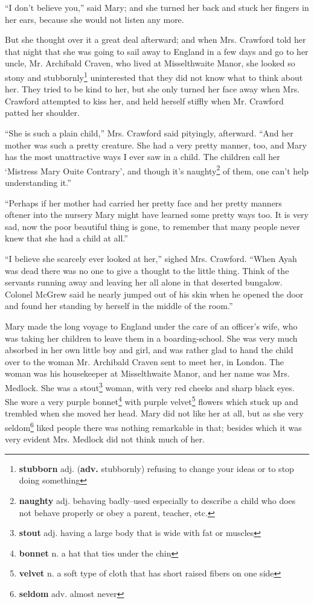 ``I don't believe you,'' said Mary; and she turned her back and stuck her fingers in her ears, because she would not listen any more.

But she thought over it a great deal afterward; and when Mrs. Crawford told her that night that she was going to sail away to England in a few days and go to her uncle, Mr. Archibald Craven, who lived at Misselthwaite Manor, she looked so stony and stubbornly\footnote{\textbf{stubborn} adj. (\textbf{adv.} stubbornly) refusing to change your ideas or to stop doing something} uninterested that they did not know what to think about her. They tried to be kind to her, but she only turned her face away when Mrs. Crawford attempted to kiss her, and held herself stiffly when Mr. Crawford patted her shoulder.

``She is such a plain child,'' Mrs. Crawford said pityingly, afterward. ``And her mother was such a pretty creature. She had a very pretty manner, too, and Mary has the most unattractive ways I ever saw in a child. The children call her `Mistress Mary Ouite Contrary', and though it's naughty\footnote{\textbf{naughty} adj. behaving badly--used especially to describe a child who does not behave properly or obey a parent, teacher, etc.} of them, one can't help understanding it.''

``Perhaps if her mother had carried her pretty face and her pretty manners oftener into the nursery Mary might have learned some pretty ways too. It is very sad, now the poor beautiful thing is gone, to remember that many people never knew that she had a child at all.''

``I believe she scarcely ever looked at her,'' sighed Mrs. Crawford. ``When Ayah was dead there was no one to give a thought to the little thing. Think of the servants running away and leaving her all alone in that deserted bungalow. Colonel McGrew said he nearly jumped out of his skin when he opened the door and found her standing by herself in the middle of the room.''

Mary made the long voyage to England under the care of an officer's wife, who was taking her children to leave them in a boarding-school. She was very much absorbed in her own little boy and girl, and was rather glad to hand the child over to the woman Mr. Archibald Craven sent to meet her, in London. The woman was his housekeeper at Misselthwaite Manor, and her name was Mrs. Medlock. She was a stout\footnote{\textbf{stout} adj. having a large body that is wide with fat or muscles} woman, with very red cheeks and sharp black eyes. She wore a very purple bonnet\footnote{\textbf{bonnet} n. a hat that ties under the chin} with purple velvet\footnote{\textbf{velvet} n. a soft type of cloth that has short raised fibers on one side} flowers which stuck up and trembled when she moved her head. Mary did not like her at all, but as she very seldom\footnote{\textbf{seldom} adv. almost never} liked people there was nothing remarkable in that; besides which it was very evident Mrs. Medlock did not think much of her.

